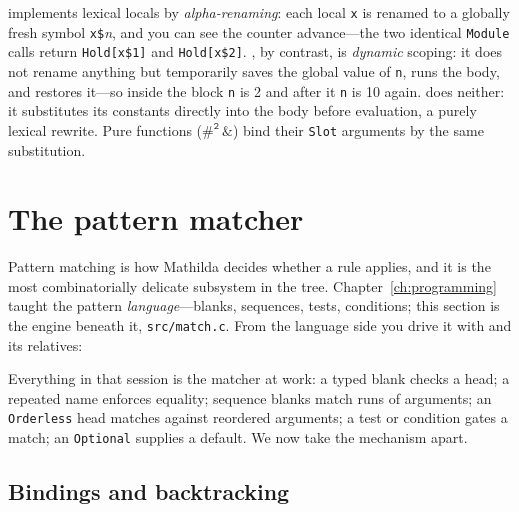  implements lexical locals by \emph{alpha-renaming}: each local \texttt{x} is
renamed to a globally fresh symbol \texttt{x\$}\textit{n}, and you can see the counter
advance---the two identical \texttt{Module} calls return \texttt{Hold[x\$1]} and
\texttt{Hold[x\$2]}. , by contrast, is \emph{dynamic} scoping: it does not
rename anything but temporarily saves the global value of \texttt{n}, runs the body,
and restores it---so inside the block \texttt{n} is 2 and after it \texttt{n} is 10
again.  does neither: it substitutes its constants directly into the body
before evaluation, a purely lexical rewrite. Pure functions
(\(\mathtt{\#^2\, \&}\)) bind their \texttt{Slot} arguments by the same
substitution.

\section{The pattern matcher}
\label{sec:int-match}

Pattern matching is how Mathilda decides whether a rule applies, and it is the most
combinatorially delicate subsystem in the tree. Chapter~\ref{ch:programming} taught
the pattern \emph{language}---blanks, sequences, tests, conditions; this section is the
engine beneath it, \texttt{src/match.c}. From the language side you drive it with
 and its relatives:


Everything in that session is the matcher at work: a typed blank checks a head; a
repeated name enforces equality; sequence blanks match runs of arguments; an
\texttt{Orderless} head matches against reordered arguments; a test or condition
gates a match; an \texttt{Optional} supplies a default. We now take the mechanism
apart.

\subsection*{Bindings and backtracking}

